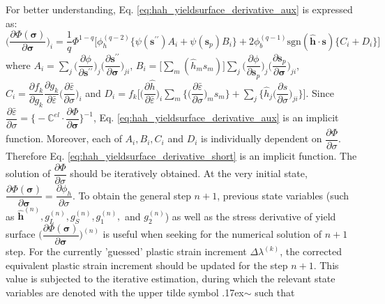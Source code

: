 \documentclass[12pt]{amsart}
\begin{document}
For better understanding, Eq. \ref{eq:hah_yieldsurface_derivative_aux} is expressed as:
\begin{equation}
  \label{eq:hah_yieldsurface_derivative_short}
  \bigg(\dfrac{\partial\Phi(\mathbf{\sigma})}{\partial\mathbf{\sigma}}\bigg)_i=\frac{1}{q}\Phi^{1-q}\bigg[\phi_h^{(q-2)}\bigg\{\psi(\mathbf{s}^{\prime\prime})A_i+\psi(\mathbf{s}_p)B_i\bigg\}+2\phi_b^{(q-1)}\text{sgn}(\hat{\mathbf{h}}\cdot\mathbf{s})\bigg\{C_i+ D_i\bigg\} \bigg]
\end{equation}
where $A_{i}=\sum_j\bigg(\dfrac{\partial\phi}{\partial\mathbf{s}^{\prime\prime}}\bigg)_{j}\bigg(\dfrac{\partial\mathbf{s}^{\prime\prime}}{\partial\mathbf{\sigma}}\bigg)_{ji}$, $B_{i}=\bigg[\sum_m(\hat{h}_ms_m)\bigg]\sum_j\bigg(\dfrac{\partial\phi}{\partial\mathbf{s}_p}\bigg)_{j}\bigg(\dfrac{\partial\mathbf{s}_p}{\partial\mathbf{\sigma}}\bigg)_{ji}$,$C_i=\dfrac{\partial f_k}{\partial g_k}\dfrac{\partial g_k}{\partial \bar{\varepsilon}}\bigg(\dfrac{\partial\bar{\varepsilon}}{\partial\sigma}\bigg)_{i}$ and $D_i= f_k\bigg[\bigg(\dfrac{\partial\hat{h}}{\partial\bar{\varepsilon}}\bigg)_i\sum_m\bigg\{{\bigg(\dfrac{\partial\bar{\varepsilon}}{\partial\sigma}\bigg)_m s_m}\bigg\}+\sum_j\bigg\{\hat{h}_j\bigg(\dfrac{\partial s}{\partial\sigma}\bigg)_{ji}\bigg\} \bigg]$.
Since $\dfrac{\partial\bar{\varepsilon}}{\partial\sigma}=\bigg\{-\mathbb{C}^{el}\cdot\dfrac{\partial\Phi}{\partial\mathbf{\sigma}}\bigg\}^{-1}$, Eq. \ref{eq:hah_yieldsurface_derivative_aux} is an implicit function.
Moreover, each of $A_i, B_i, C_i$ and $D_i$ is individually dependent on $\dfrac{\partial\Phi}{\partial\sigma}$. Therefore Eq. \ref{eq:hah_yieldsurface_derivative_short} is an implicit function.
The solution of $\dfrac{\partial\Phi}{\partial\sigma}$ should be iteratively obtained.
At the very initial state, $\dfrac{\partial\Phi(\mathbf{\sigma})}{\partial\mathbf{\sigma}}=\dfrac{\partial \phi_h}{\partial\sigma}$.
To obtain the general step $n+1$, previous state variables (such as $\hat{\mathbf{h}}^{(n)}, g_L^{(n)}, g_S^{(n)}, g_1^{(n)},$ and $g_2^{(n)}$) as well as the  stress derivative of yield surface $\bigg(\dfrac{\partial\Phi(\mathbf{\sigma})}{\partial\mathbf{\sigma}}\bigg)^{(n)}$ is useful when seeking for the numerical solution of $n+1$ step.
For the currently 'guessed' plastic strain increment $\Delta\lambda^{(k)}$, the corrected equivalent plastic strain increment should be updated for the step $n+1$.
This value is subjected to the iterative estimation, during which the relevant state variables are denoted with the upper tilde symbol {\raise.17ex\hbox{$\scriptstyle\sim$}} such that
\end{document}
